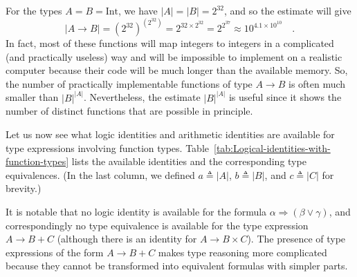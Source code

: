 For the types $A=B=\text{Int}$, we have $\left|A\right|=\left|B\right|=2^{32}$,
and so the estimate will give 
\[
\left|A\rightarrow B\right|=\left(2^{32}\right)^{\left(2^{32}\right)}=2^{32\times2^{32}}=2^{2^{37}}\approx10^{4.1\times10^{10}}\quad.
\]
In fact, most of these functions will map integers to integers in
a complicated (and practically useless) way and will be impossible
to implement on a realistic computer because their code will be much
longer than the available memory. So, the number of practically implementable
functions of type $A\rightarrow B$ is often much smaller than $\left|B\right|^{\left|A\right|}$.
Nevertheless, the estimate $\left|B\right|^{\left|A\right|}$ is useful
since it shows the number of distinct functions that are possible
in principle.

Let us now see what logic identities and arithmetic identities are
available for type expressions involving function types. Table~\ref{tab:Logical-identities-with-function-types}
lists the available identities and the corresponding type equivalences.
(In the last column, we defined $a\triangleq\left|A\right|$, $b\triangleq\left|B\right|$,
and $c\triangleq\left|C\right|$ for brevity.) 

It is notable that no logic identity is available for the formula
$\alpha\Rightarrow\left(\beta\vee\gamma\right)$, and correspondingly
no type equivalence is available for the type expression $A\rightarrow B+C$
(although there is an identity for $A\rightarrow B\times C$). The
presence of type expressions of the form $A\rightarrow B+C$ makes
type reasoning more complicated because they cannot be transformed
into equivalent formulas with simpler parts.

